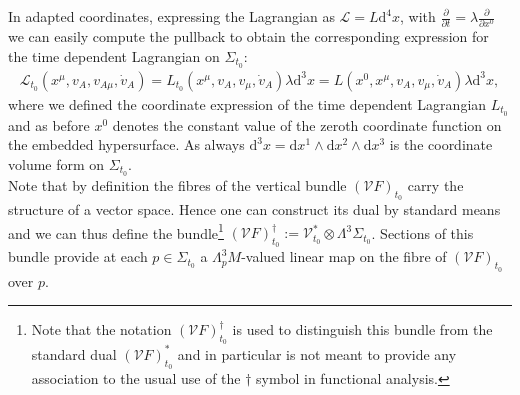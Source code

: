 \documentclass[a4paper,12pt, DIV=14, BCOR=5mm, twoside, headsepline]{scrbook}
\begin{document}
In adapted coordinates, expressing the Lagrangian as $\mathcal{L} = L \mathrm{d}^4x$, with $\frac{\partial}{\partial t} = \lambda \frac{\partial}{\partial x^0}$ we can easily compute the pullback to obtain the corresponding expression for the time dependent Lagrangian on $\Sigma_{t_0}$:
\begin{align}
    \mathcal{L}_{t_0}(x^{\mu}, v_A, v_{A{\mu}}, \dot{v}_A) = L_{t_0}(x^{\mu}, v_A, v_{\mu}, \dot{v}_A)\lambda \mathrm{d}^3x= L(x^0,x^{\mu}, v_A, v_{\mu}, \dot{v}_A)\lambda \mathrm{d}^3x,
\end{align}
where we defined the coordinate expression of the time dependent Lagrangian $L_{t_0}$ and as before $x^0$ denotes the constant value of the zeroth coordinate function on the embedded hypersurface. As always $\mathrm{d}^3x = \mathrm{d}x^1 \wedge \mathrm{d}x^2 \wedge \mathrm{d}x^3$ is the coordinate volume form on $\Sigma_{t_0}$.\\
%
%
%
%
%
%
%

Note that by definition the fibres of the vertical bundle $(\mathcal{V}F)_{t_0}$ carry the structure of a vector space. 
Hence one can construct its dual by standard means and we can thus define the bundle\footnote{Note that the notation $(\mathcal{V}F)_{t_0}^{\dagger}$ is used to distinguish this bundle from the standard dual $(\mathcal{V}F)_{t_0}^{\ast}$ and in particular is not meant to provide any association to the usual use of the $\dagger$ symbol in functional analysis. } $(\mathcal{V}F)_{t_0}^{\dagger} := \mathcal{V}_{t_0}^{\ast} \otimes \Lambda^3\Sigma_{t_0}$. Sections of this bundle provide at each $p \in \Sigma_{t_0}$ a $\Lambda^3_pM$-valued linear map on the fibre of $(\mathcal{V}F)_{t_0}$ over $p$.
\end{document}
